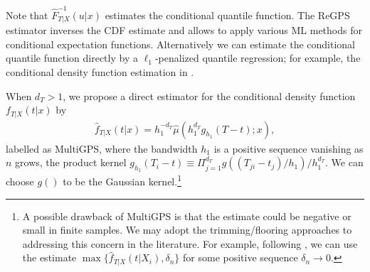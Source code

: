 \documentclass[lettersize, 12pt]{article}
\begin{document}
Note that $\hat F^{-1}_{T|X}(u|x)$ estimates the conditional quantile function.
The ReGPS estimator inverses the CDF estimate and allows to apply various ML methods for conditional expectation functions. 
Alternatively we can estimate the conditional quantile function directly by a $\ell_1$-penalized quantile regression;
for example,  the conditional density function estimation in \cite{BCK19JASA}. 


When $d_T > 1$, we propose a direct estimator for the conditional density function $f_{T|X}(t|x)$ by 
\begin{align}
\hat f_{T|X}(t|x) 
= h_1^{-d_T}\hat\mu\left(h_1^{d_T}g_{h_1}(T-t); x\right), 
\tag{MultiGPS}
\label{MultiGPS}
\end{align}
labelled as MultiGPS,
where 
the bandwidth $h_1$ is a positive sequence vanishing as $n$ grows,
the product kernel $g_{h_1}(T_i-t) \equiv \Pi_{j=1}^{d_T} g((T_{ji} - t_j)/h_1)/h_1^{d_T}$.
We can choose $g()$ to be the Gaussian kernel.\footnote{A possible drawback of MultiGPS is that the estimate could be negative or small in finite samples. 
We may adopt the trimming/flooring approaches to addressing this concern in the literature.
For example, following \cite{HLL20ER}, we can use the estimate $\max\{\hat f_{T|X}(t|X_i), \delta_n\}$ for some positive sequence $\delta_n\rightarrow 0$.
 }
\end{document}
